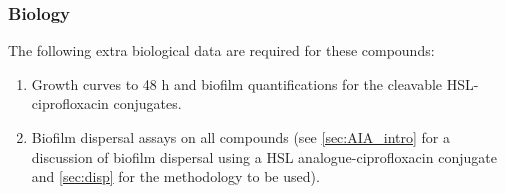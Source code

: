 \subsubsection{Biology}

The following extra biological data are required for these compounds:

\begin{enumerate}

\item Growth curves to 48 h and biofilm quantifications for the cleavable HSL-ciprofloxacin conjugates.

\item Biofilm dispersal assays on all compounds (see \ref{sec:AIA_intro} for a discussion of biofilm dispersal using a HSL analogue-ciprofloxacin conjugate and \ref{sec:disp} for the methodology to be used).

\end{enumerate}